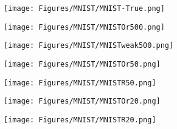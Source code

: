 \begin{figure*}[htbp]
    \centering
    \begin{minipage}{0.18\textwidth}
        \centering
        \texttt{[image: Figures/MNIST/MNIST-True.png]}
    \end{minipage}
    
    \vspace{0.2em} %
    
    \begin{minipage}{0.18\textwidth}
        \centering
        \texttt{[image: Figures/MNIST/MNISTOr500.png]}
    \end{minipage}
    \hspace{9em} 
    \begin{minipage}{0.18\textwidth}
        \centering
        \texttt{[image: Figures/MNIST/MNISTweak500.png]}
    \end{minipage}
    
    \vspace{0.2em} 
    \begin{minipage}{0.18\textwidth}
        \centering
        \texttt{[image: Figures/MNIST/MNISTOr50.png]}
    \end{minipage}
    \hspace{9em} 
    \begin{minipage}{0.18\textwidth}
        \centering
        \texttt{[image: Figures/MNIST/MNISTR50.png]}
    \end{minipage}
    
    \vspace{0.2em} 
    
    \begin{minipage}{0.18\textwidth}
        \centering
        \texttt{[image: Figures/MNIST/MNISTOr20.png]}
    \end{minipage}
    \hspace{9em} 
    \begin{minipage}{0.18\textwidth}
        \centering
        \texttt{[image: Figures/MNIST/MNISTR20.png]}
    \end{minipage}
    

\end{figure*}
